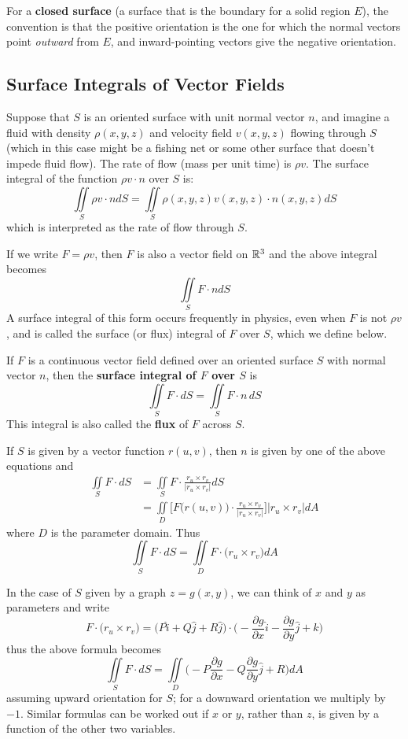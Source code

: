 For a \textbf{closed surface} (a surface that is the boundary for a solid region $E$), the convention is that the positive orientation is the one for which the normal vectors point \textit{outward} from $E$, and inward-pointing vectors give the negative orientation.

\subsection{Surface Integrals of Vector Fields}

Suppose that $S$ is an oriented surface with unit normal vector $n$, and imagine a fluid with density $\rho (x,y,z)$ and velocity field $v(x,y,z)$ flowing through $S$ (which in this case might be a fishing net or some other surface that doesn't impede fluid flow). The rate of flow (mass per unit time) is $\rho v$. The surface integral of the function $\rho v \cdot n$ over $S$ is: $$\iint\limits_S \rho v \cdot n dS = \iint\limits_S \rho (x,y,z) v(x,y,z) \cdot n(x,y,z) dS$$ which is interpreted as the rate of flow through $S$.

If we write $F = \rho v$, then $F$ is also a vector field on $\mathbb{R}^3$ and the above integral becomes $$\iint\limits_S F \cdot n dS$$ A surface integral of this form occurs frequently in physics, even when $F$ is not $\rho v$, and is called the surface (or flux) integral of $F$ over $S$, which we define below.

If $F$ is a continuous vector field defined over an oriented surface $S$ with normal vector $n$, then the \textbf{surface integral of $F$ over $S$} is $$\iint\limits_S F \cdot dS = \iint\limits_S F \cdot n \, dS$$ This integral is also called the \textbf{flux} of $F$ across $S$.

If $S$ is given by a vector function $r(u,v)$, then $n$ is given by one of the above equations and $$\begin{aligned}
    \iint\limits_S F \cdot dS&= \iint\limits_S F \cdot \frac{r_u \times r_v}{|r_u \times r_v|} dS\\
    &= \iint\limits_D \Big[ F\big(r(u,v)\big) \cdot \frac{r_u \times r_v}{|r_u \times r_v|} \Big] |r_u \times r_v| dA
\end{aligned}$$ where $D$ is the parameter domain. Thus $$\iint\limits_S F \cdot dS = \iint\limits_D F \cdot \big( r_u \times r_v \big) dA$$

In the case of $S$ given by a graph $z = g(x,y)$, we can think of $x$ and $y$ as parameters and write $$F \cdot \big( r_u \times r_v \big) = \big(P\hat{i} + Q\hat{j} + R\hat{j}\big) \cdot \Big(-\frac{\partial g}{\partial x}\hat{i} - \frac{\partial g}{\partial y}\hat{j} + k \Big)$$ thus the above formula becomes $$\iint\limits_S F \cdot dS = \iint\limits_D \Big(-P\frac{\partial g}{\partial x} - Q\frac{\partial g}{\partial y}\hat{j} + R \Big) dA$$ assuming upward orientation for $S$; for a downward orientation we multiply by $-1$. Similar formulas can be worked out if $x$ or $y$, rather than $z$, is given by a function of the other two variables.


